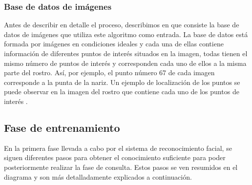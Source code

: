 \subsubsection{Base de datos de imágenes}

Antes de describir en detalle el proceso, describimos en que consiste la base de datos de imágenes que utiliza este algoritmo como entrada. La base de datos est\'a formada por imágenes en condiciones ideales y cada una de ellas contiene información de diferentes puntos de interés situados en la imagen, todas tienen el mismo n\'umero de puntos de interés y corresponden cada uno de ellos a la misma parte del rostro. As\'i, por ejemplo, el punto n\'umero 67 de cada imagen corresponde a la punta de la nariz. Un ejemplo de localización de los puntos se puede observar en la imagen del rostro que contiene cada uno de los puntos de interés .

\subsection{Fase de entrenamiento}

En la primera fase llevada a cabo por el sistema de reconocimiento facial, se siguen diferentes pasos para obtener el conocimiento suficiente para poder posteriormente realizar la fase de consulta. Estos pasos se ven resumidos en el diagrama  y son m\'as detalladamente explicados a continuación. 



